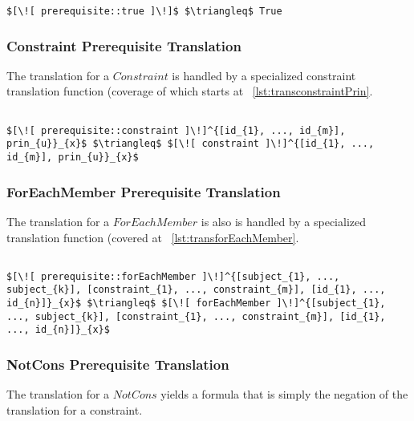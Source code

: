 \lstset{mathescape, language=AST}  
\begin{lstlisting}[frame=single, caption={Prerequisite Translation {$\colon$} Always True Prerequisite},label={lst:transpreRequisiteTruePrq}]
	$[\![ prerequisite::true ]\!]$ $\triangleq$ True
\end{lstlisting}

\subsubsection{Constraint Prerequisite Translation}
The translation for a $Constraint$ is handled by a specialized constraint translation function (coverage of which starts at ~\ref{lst:transconstraintPrin}.

\lstset{mathescape, language=AST}  
\begin{lstlisting}[frame=single, caption={Prerequisite Translation {$\colon$} Constraint},label={lst:transpreRequisiteConstraint}]

$[\![ prerequisite::constraint ]\!]^{[id_{1}, ..., id_{m}], prin_{u}}_{x}$ $\triangleq$ $[\![ constraint ]\!]^{[id_{1}, ..., id_{m}], prin_{u}}_{x}$ 
\end{lstlisting}

\subsubsection{ForEachMember Prerequisite Translation}
The translation for a $ForEachMember$ is also is handled by a specialized translation function (covered at ~\ref{lst:transforEachMember}.

\lstset{mathescape, language=AST}  
\begin{lstlisting}[frame=single, caption={Prerequisite Translation {$\colon$} ForEachMember},label={lst:transpreRequisiteForEachMember}]

$[\![ prerequisite::forEachMember ]\!]^{[subject_{1}, ..., subject_{k}], [constraint_{1}, ..., constraint_{m}], [id_{1}, ..., id_{n}]}_{x}$ $\triangleq$ $[\![ forEachMember ]\!]^{[subject_{1}, ..., subject_{k}], [constraint_{1}, ..., constraint_{m}], [id_{1}, ..., id_{n}]}_{x}$ 	
\end{lstlisting}

\subsubsection{NotCons Prerequisite Translation}
The translation for a $NotCons$ yields a formula that is simply the negation of the translation for a constraint.

